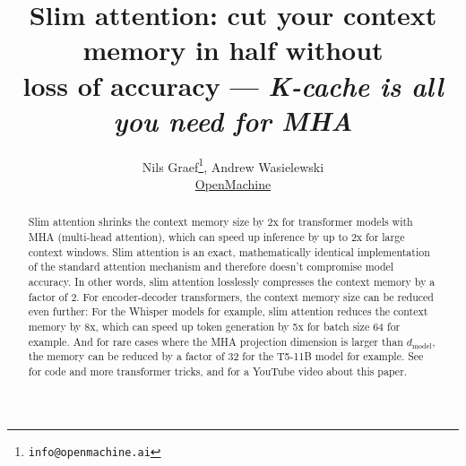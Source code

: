 \documentclass{article}
\title{Slim attention: cut your context memory in half without \\ loss of accuracy --- \emph{K-cache is all you need for MHA}}
\author{Nils Graef\thanks{\texttt{info@openmachine.ai}}, Andrew Wasielewski \\
  \href{https://openmachine.ai}{OpenMachine}}
\begin{document}
 \maketitle

\begin{abstract}
Slim attention shrinks the context memory size by 2x for transformer models with MHA (multi-head attention), which can speed up inference by up to 2x for large context windows. Slim attention is an exact, mathematically identical implementation of the standard attention mechanism and therefore doesn’t compromise model accuracy. In other words, slim attention losslessly compresses the context memory by a factor of 2. For encoder-decoder transformers, the context memory size can be reduced even further: For the Whisper models for example, slim attention reduces the context memory by 8x, which can speed up token generation by 5x for batch size 64 for example. And for rare cases where the MHA projection dimension is larger than $d_{\text{model}}$, the memory can be reduced by a factor of 32 for the T5-11B model for example. See \citep{tricks} for code and more transformer tricks, and \citep{slim-video} for a YouTube video about this paper.
\end{abstract}
\end{document}

